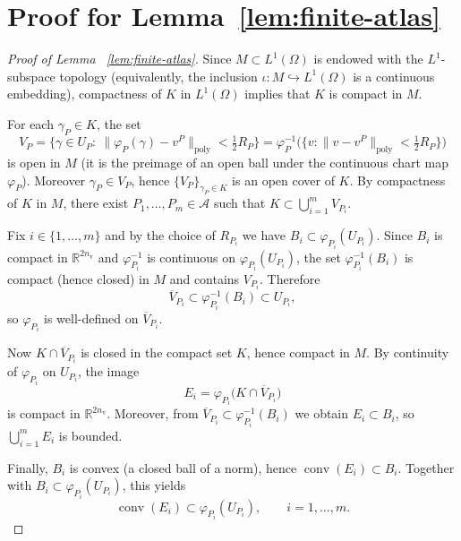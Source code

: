 \documentclass{article}
\newcommand{\R}{\mathbb{R}}
\begin{document}
\section{Proof for Lemma~\ref{lem:finite-atlas}}
\begin{proof}[Proof of Lemma ~\ref{lem:finite-atlas}]
Since $M\subset L^{1}(\Omega)$ is endowed with the $L^{1}$-subspace topology (equivalently, the inclusion
$\iota:M\hookrightarrow L^{1}(\Omega)$ is a continuous embedding), compactness of $K$ in $L^{1}(\Omega)$ implies
that $K$ is compact in $M$.


For each $\gamma_P\in K$, the set
\[
V_{P}=\Big\{\gamma\in U_P:\ \|\varphi_P(\gamma)-v^{P}\|_{\mathrm{poly}}<\tfrac12 R_{P}\Big\}
=\varphi_P^{-1}\!\bigl(\{v:\|v-v^{P}\|_{\mathrm{poly}}<\tfrac12R_P\}\bigr)
\]
is open in $M$ (it is the preimage of an open ball under the continuous chart map $\varphi_P$).
Moreover $\gamma_P\in V_P$, hence $\{V_P\}_{\gamma_P\in K}$ is an open cover of $K$.
By compactness of $K$ in $M$, there exist $P_1,\dots,P_m\in\mathcal A$ such that
$K\subset\bigcup_{i=1}^m V_{P_i}$.

Fix $i\in\{1,\dots,m\}$ and by the choice of $R_{P_i}$ we have $B_i\subset \varphi_{P_i}(U_{P_i})$.
Since $B_i$ is compact in $\R^{2n_{\mathrm v}}$ and $\varphi_{P_i}^{-1}$ is continuous on $\varphi_{P_i}(U_{P_i})$,
the set $\varphi_{P_i}^{-1}(B_i)$ is compact (hence closed) in $M$ and contains $V_{P_i}$.
Therefore
\[
\overline{V}_{P_i}\subset \varphi_{P_i}^{-1}(B_i)\subset U_{P_i},
\]
so $\varphi_{P_i}$ is well-defined on $\overline{V}_{P_i}$.

Now $K\cap \overline{V}_{P_i}$ is closed in the compact set $K$, hence compact in $M$.
By continuity of $\varphi_{P_i}$ on $U_{P_i}$, the image
\[
E_i=\varphi_{P_i}\bigl(K\cap \overline{V}_{P_i}\bigr)
\]
is compact in $\R^{2n_{\mathrm v}}$. Moreover, from $\overline{V}_{P_i}\subset \varphi_{P_i}^{-1}(B_i)$ we obtain
$E_i\subset B_i$, so $\bigcup_{i=1}^m E_i$ is bounded.

Finally, $B_i$ is convex (a closed ball of a norm), hence $\operatorname{conv}(E_i)\subset B_i$.
Together with $B_i\subset \varphi_{P_i}(U_{P_i})$, this yields
\[
\operatorname{conv}(E_i)\subset \varphi_{P_i}(U_{P_i}),\qquad i=1,\dots,m.
\]
\end{proof}
\end{document}
